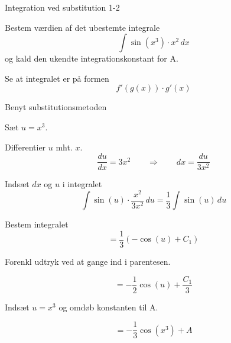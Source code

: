 \documentclass{article}
\begin{document}
\begin{exercise}{Integration ved substitution 1-2}
	
	
	Bestem værdien af det ubestemte integrale
	\[
	\int \sin(x^3) \cdot x^2 \, dx
	\]
	og kald den ukendte integrationskonstant for A.
	
	
	
	
	\hint
	
	Se at integralet er på formen
	\[
	f'(g(x)) \cdot g'(x)
	\]
	
	\hint
	
	Benyt substitutionsmetoden
	
	\hint
	
	Sæt $u=x^3$.
	
	
	\hint
	
	Differentier $u$ mht. $x$.
	\[
	\frac{du}{dx} = 3x^2 \qquad	\Rightarrow \qquad dx = \frac{du}{3x^2}
	\]
	
	\hint
	
	Indsæt $dx$ og $u$ i integralet
	\[
	\int \sin(u) \cdot \frac{x^2}{3x^2} \, du = \frac{1}{3} \int \sin(u) \, du
	\]
	
	\hint
	
	Bestem integralet
	\[
	= \frac{1}{3} \left( -\cos(u) + C_1 \right)
	\]
	
	\hint
	Forenkl udtryk ved at gange ind i parentesen.
	
	\hint
	
	\[
	= - \frac{1}{2} \cos(u) + \frac{C_1}{3}
	\]
	
	\hint
	
	Indsæt $u = x^3$ og omdøb konstanten  til A.
	
	\hint
	
	\[
	= - \frac{1}{3} \cos(x^3) + A
	\]
	
	
\end{exercise}

\newpage
\end{document}
